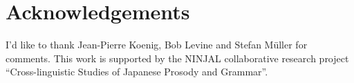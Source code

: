 \documentclass[output=paper
                ,modfonts
 	        ,biblatex
                ,babelshorthands
                ,newtxmath
                ,draftmode
                ,colorlinks, citecolor=brown
]{langscibook}
\begin{document}
\section*{Acknowledgements}

I'd like to thank Jean-Pierre Koenig, Bob Levine and Stefan Müller
for comments. This work is supported by the NINJAL collaborative
research project ``Cross-linguistic Studies of Japanese Prosody and Grammar''.

{\sloppy
\printbibliography[heading=subbibliography,notkeyword=this] 
}
\end{document}
